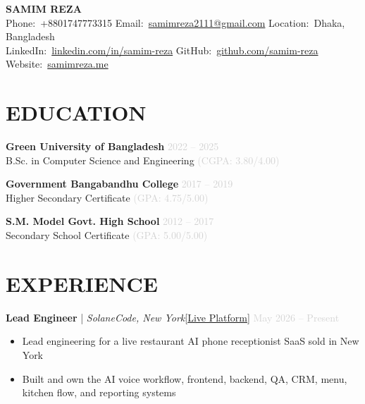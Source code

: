 \documentclass[a4paper,10pt]{article}
\newcommand{\faPhone}{Phone:}
\newcommand{\faEnvelope}{Email:}
\newcommand{\faMapMarker}{Location:}
\newcommand{\faLinkedin}{LinkedIn:}
\newcommand{\faGithub}{GitHub:}
\newcommand{\faGlobe}{Website:}
\begin{document}
\begin{center}
    {\Huge \textbf{SAMIM REZA}} \\[3pt]
    \color{lightgray}
    \faPhone\ +8801747773315 \quad
    \faEnvelope\ \href{mailto:samimreza2111@gmail.com}{samimreza2111@gmail.com} \quad
    \faMapMarker\ Dhaka, Bangladesh \\
    \faLinkedin\ \href{https://www.linkedin.com/in/samim-reza}{linkedin.com/in/samim-reza} \quad
    \faGithub\ \href{https://github.com/samim-reza}{github.com/samim-reza} \quad
    \faGlobe\ \href{https://samimreza.me}{samimreza.me}
\end{center}

\vspace{-0.2cm}

\section*{EDUCATION}
\textbf{Green University of Bangladesh} \hfill \textcolor{lightgray}{2022 -- 2025}\\
B.Sc. in Computer Science and Engineering \textcolor{lightgray}{(CGPA: 3.80/4.00)}

\textbf{Government Bangabandhu College} \hfill \textcolor{lightgray}{2017 -- 2019}\\
Higher Secondary Certificate \textcolor{lightgray}{(GPA: 4.75/5.00)}

\textbf{S.M. Model Govt. High School} \hfill \textcolor{lightgray}{2012 -- 2017}\\
Secondary School Certificate \textcolor{lightgray}{(GPA: 5.00/5.00)}

\vspace{0.1cm}

\section*{EXPERIENCE}

\textbf{Lead Engineer} | \textit{SolaneCode, New York}\hfill[\href{https://restaurant.sloancode.com/}{\color{maincolor}Live Platform}]   \textcolor{lightgray}{May 2026 -- Present}
\begin{itemize}
    \item Lead engineering for a live restaurant AI phone receptionist SaaS sold in New York
    \item Built and own the AI voice workflow, frontend, backend, QA, CRM, menu, kitchen flow, and reporting systems
\end{itemize}
\end{document}
